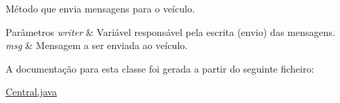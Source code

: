 Método que envia mensagens para o veículo. 


\begin{DoxyParams}{Parâmetros}
{\em writer} & Variável responsável pela escrita (envio) das mensagens. \\
\hline
{\em msg} & Mensagem a ser enviada ao veículo. \\
\hline
\end{DoxyParams}


A documentação para esta classe foi gerada a partir do seguinte ficheiro\+:\begin{DoxyCompactItemize}
\item 
\mbox{\hyperlink{_central_8java}{Central.\+java}}\end{DoxyCompactItemize}

